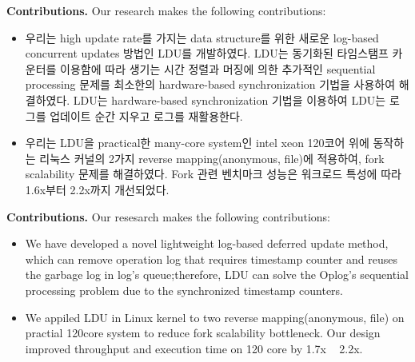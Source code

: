 \ifkor
\noindent
\textbf{Contributions.} Our research makes the following contributions:
\begin{itemize}
\item 우리는 high update rate를 가지는 data structure를 위한 새로운 log-based
concurrent updates 방법인 LDU를 개발하였다.
LDU는 동기화된 타임스탬프 카운터를 이용함에 따라 생기는 시간 정렬과 머징에 의한 추가적인 sequential processing 문제를
최소한의 hardware-based synchronization 기법을 사용하여 해결하였다.
LDU는 hardware-based synchronization 기법을 이용하여 LDU는 로그를 업데이트 순간 지우고 로그를 재활용한다.
\item 우리는 LDU을 practical한 many-core system인 intel xeon 120코어 위에 동작하는 리눅스 커널의
2가지 reverse mapping(anonymous, file)에 적용하여, fork scalability 문제를 해결하였다.
Fork 관련 벤치마크 성능은 워크로드 특성에 따라 1.6x부터 2.2x까지 개선되었다.
\end{itemize}
\else

\textbf{Contributions.} Our resesarch makes the following contributions:
\begin{itemize}
\item We have developed a novel lightweight log-based deferred update method,
which can remove operation log that requires timestamp counter and reuses
the garbage log in log's queue;therefore, LDU can solve the Oplog's sequential processing problem due to the synchronized timestamp counters.
\item 
We appiled LDU in Linux kernel to two reverse mapping(anonymous, file) on
practial 120core system to reduce fork scalability bottleneck.
Our design improved throughput and execution time on 120 core by 1.7x ~ 2.2x.
\end{itemize}

